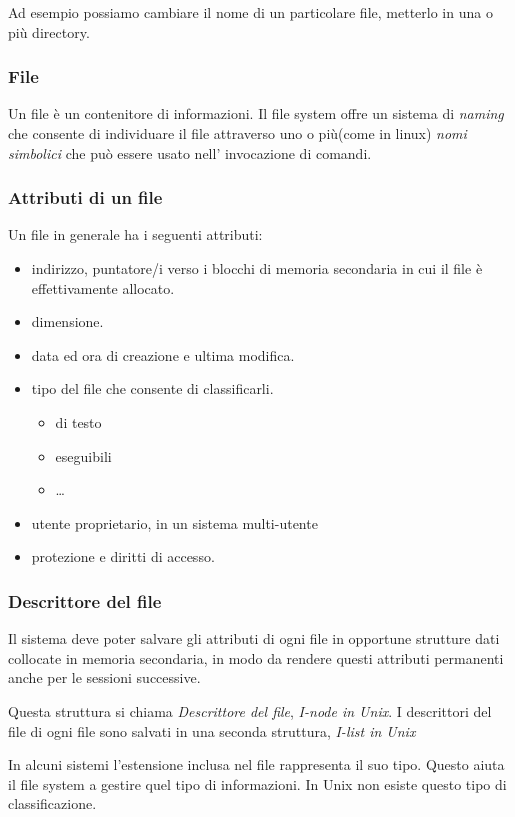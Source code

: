 \documentclass
[10pt,        %
 a4paper,     %
 onecolumn,   %
 fleqn,       %
 oneside,     %
 notitlepage, %
]{article}    %
\begin{document}
Ad esempio possiamo cambiare il nome di un particolare file, metterlo in una o più directory.

\subsubsection{File}
Un file è un contenitore di informazioni. Il file system offre un sistema di \textit{naming} che consente di individuare il file attraverso uno o più(come in linux) \textit{nomi simbolici} che può essere usato nell' invocazione di comandi.

\subsubsection{Attributi di un file}
Un file in generale ha i seguenti attributi:
\begin{itemize}
    \item indirizzo, puntatore/i verso i blocchi di memoria secondaria in cui il file è effettivamente allocato.
    \item dimensione.
    \item data ed ora di creazione e ultima modifica.
    \item tipo del file che consente di classificarli.
    \begin{itemize}
        \item di testo
        \item eseguibili
        \item \dots
    \end{itemize}
    \item utente proprietario, in un sistema multi-utente
    \item protezione e diritti di accesso.
\end{itemize}

\subsubsection{Descrittore del file}
Il sistema deve poter salvare gli attributi di ogni file in opportune strutture dati collocate in memoria secondaria, in modo da rendere questi attributi permanenti anche per le sessioni successive.

Questa struttura si chiama \textit{Descrittore del file}, \textit{I-node in Unix}. I descrittori del file di ogni file sono salvati in una seconda struttura, \textit{I-list in Unix}

In alcuni sistemi l'estensione inclusa nel file rappresenta il suo tipo. Questo aiuta il file system a gestire quel tipo di informazioni. In Unix non esiste questo tipo di classificazione.
\end{document}
